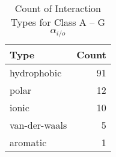 \begin{table}[!h]

\caption{\label{tab:interaction-types-a-gio}Count of Interaction Types for Class A – G$\alpha_{i/o}$}
\centering
\begin{tabular}{lr}
\toprule
Type & Count\\
\midrule
hydrophobic & 91\\
polar & 12\\
ionic & 10\\
van-der-waals & 5\\
aromatic & 1\\
\bottomrule
\end{tabular}
\end{table}
